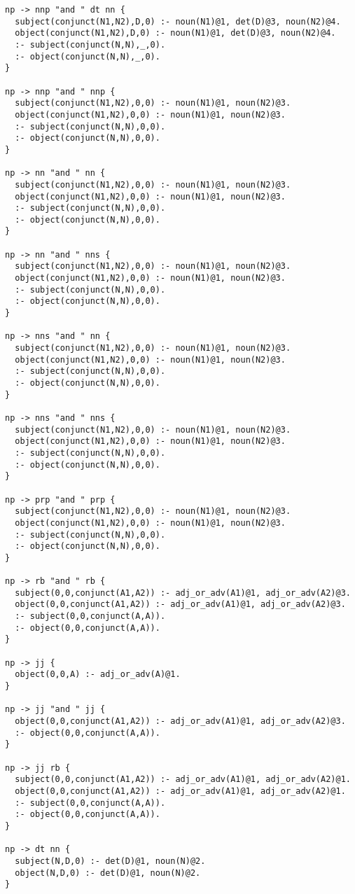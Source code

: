 \begin{lstlisting}
np -> nnp "and " dt nn {
  subject(conjunct(N1,N2),D,0) :- noun(N1)@1, det(D)@3, noun(N2)@4.
  object(conjunct(N1,N2),D,0) :- noun(N1)@1, det(D)@3, noun(N2)@4.
  :- subject(conjunct(N,N),_,0).
  :- object(conjunct(N,N),_,0).
}

np -> nnp "and " nnp {
  subject(conjunct(N1,N2),0,0) :- noun(N1)@1, noun(N2)@3.
  object(conjunct(N1,N2),0,0) :- noun(N1)@1, noun(N2)@3.
  :- subject(conjunct(N,N),0,0).
  :- object(conjunct(N,N),0,0).
}

np -> nn "and " nn {
  subject(conjunct(N1,N2),0,0) :- noun(N1)@1, noun(N2)@3.
  object(conjunct(N1,N2),0,0) :- noun(N1)@1, noun(N2)@3.
  :- subject(conjunct(N,N),0,0).
  :- object(conjunct(N,N),0,0).
}

np -> nn "and " nns {
  subject(conjunct(N1,N2),0,0) :- noun(N1)@1, noun(N2)@3.
  object(conjunct(N1,N2),0,0) :- noun(N1)@1, noun(N2)@3.
  :- subject(conjunct(N,N),0,0).
  :- object(conjunct(N,N),0,0).
}

np -> nns "and " nn {
  subject(conjunct(N1,N2),0,0) :- noun(N1)@1, noun(N2)@3.
  object(conjunct(N1,N2),0,0) :- noun(N1)@1, noun(N2)@3.
  :- subject(conjunct(N,N),0,0).
  :- object(conjunct(N,N),0,0).
}

np -> nns "and " nns {
  subject(conjunct(N1,N2),0,0) :- noun(N1)@1, noun(N2)@3.
  object(conjunct(N1,N2),0,0) :- noun(N1)@1, noun(N2)@3.
  :- subject(conjunct(N,N),0,0).
  :- object(conjunct(N,N),0,0).
}

np -> prp "and " prp {
  subject(conjunct(N1,N2),0,0) :- noun(N1)@1, noun(N2)@3.
  object(conjunct(N1,N2),0,0) :- noun(N1)@1, noun(N2)@3.
  :- subject(conjunct(N,N),0,0).
  :- object(conjunct(N,N),0,0).
}

np -> rb "and " rb {
  subject(0,0,conjunct(A1,A2)) :- adj_or_adv(A1)@1, adj_or_adv(A2)@3.
  object(0,0,conjunct(A1,A2)) :- adj_or_adv(A1)@1, adj_or_adv(A2)@3.
  :- subject(0,0,conjunct(A,A)).
  :- object(0,0,conjunct(A,A)).
}

np -> jj {
  object(0,0,A) :- adj_or_adv(A)@1.
}

np -> jj "and " jj {
  object(0,0,conjunct(A1,A2)) :- adj_or_adv(A1)@1, adj_or_adv(A2)@3.
  :- object(0,0,conjunct(A,A)).
}

np -> jj rb {
  subject(0,0,conjunct(A1,A2)) :- adj_or_adv(A1)@1, adj_or_adv(A2)@1.
  object(0,0,conjunct(A1,A2)) :- adj_or_adv(A1)@1, adj_or_adv(A2)@1.
  :- subject(0,0,conjunct(A,A)).
  :- object(0,0,conjunct(A,A)).
}

np -> dt nn {
  subject(N,D,0) :- det(D)@1, noun(N)@2.
  object(N,D,0) :- det(D)@1, noun(N)@2.
}


\end{lstlisting}
